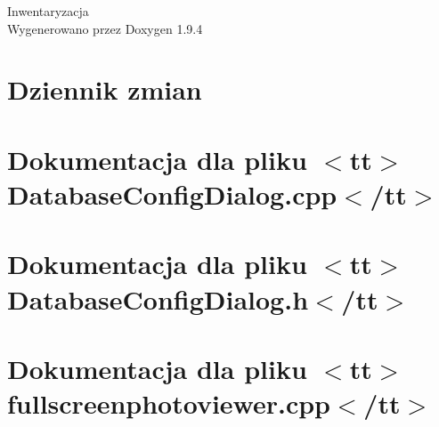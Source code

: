 \documentclass[twoside]{book}
\newcommand{\+}{\discretionary{\mbox{\scriptsize$\hookleftarrow$}}{}{}}
\newcommand{\clearemptydoublepage}{%
    \newpage{\pagestyle{empty}\cleardoublepage}%
  }
\begin{document}
  \raggedbottom
    \hypersetup{pageanchor=false,
                bookmarksnumbered=true,
                pdfencoding=unicode
               }
  \begin{titlepage}
  \vspace*{7cm}
  \begin{center}%
  {\Large Inwentaryzacja}\\
  \vspace*{1cm}
  {\large Wygenerowano przez Doxygen 1.9.4}\\
  \end{center}
  \end{titlepage}
  \clearemptydoublepage
  \tableofcontents
  \clearemptydoublepage
  \hypersetup{pageanchor=true}
\chapter{Dziennik zmian}
\label{md__c_h_a_n_g_e_l_o_g}

\chapter{Dokumentacja dla pliku \texorpdfstring{$<$}{<}tt\texorpdfstring{$>$}{>}Database\+Config\+Dialog.\+cpp\texorpdfstring{$<$}{<}/tt\texorpdfstring{$>$}{>}}
\label{md_documentation__database_config_dialog_cpp}

\chapter{Dokumentacja dla pliku \texorpdfstring{$<$}{<}tt\texorpdfstring{$>$}{>}Database\+Config\+Dialog.\+h\texorpdfstring{$<$}{<}/tt\texorpdfstring{$>$}{>}}
\label{md_documentation__database_config_dialog_h}

\chapter{Dokumentacja dla pliku \texorpdfstring{$<$}{<}tt\texorpdfstring{$>$}{>}fullscreenphotoviewer.\+cpp\texorpdfstring{$<$}{<}/tt\texorpdfstring{$>$}{>}}
\label{md_documentation_fullscreenphotoviewer_cpp}

\end{document}
